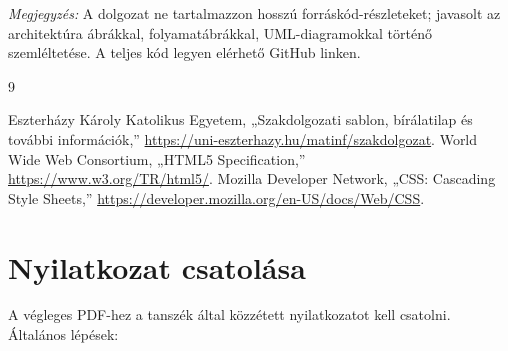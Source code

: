 \documentclass{thesis-ekf}
\begin{document}
\textit{Megjegyzés:} A dolgozat ne tartalmazzon hosszú forráskód-részleteket; javasolt az architektúra ábrákkal, folyamatábrákkal, UML-diagramokkal történő szemléltetése. A teljes kód legyen elérhető GitHub linken.

\begin{thebibliography}{9}
Eszterházy Károly Katolikus Egyetem, „Szakdolgozati sablon, bírálatilap és további információk,'' \url{https://uni-eszterhazy.hu/matinf/szakdolgozat}.
World Wide Web Consortium, „HTML5 Specification,'' \url{https://www.w3.org/TR/html5/}.
Mozilla Developer Network, „CSS: Cascading Style Sheets,'' \url{https://developer.mozilla.org/en-US/docs/Web/CSS}.
\end{thebibliography}

\chapter*{Nyilatkozat csatolása}

A végleges PDF-hez a tanszék által közzétett nyilatkozatot kell csatolni. Általános lépések:

% 
\end{document}
